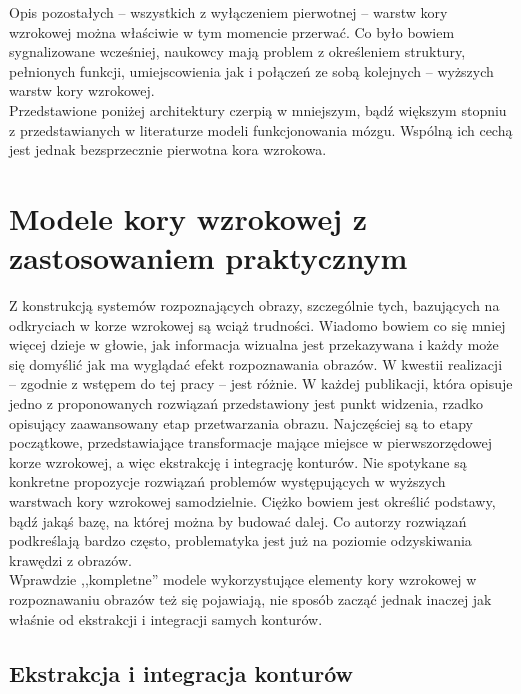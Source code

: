 Opis pozostałych -- wszystkich z wyłączeniem pierwotnej -- warstw kory wzrokowej można właściwie w tym momencie przerwać. Co było bowiem sygnalizowane wcześniej, naukowcy mają problem z określeniem struktury, pełnionych funkcji, umiejscowienia jak i połączeń ze sobą kolejnych -- wyższych warstw kory wzrokowej.\\

Przedstawione poniżej architektury czerpią w mniejszym, bądź większym stopniu z przedstawianych w literaturze modeli funkcjonowania mózgu. Wspólną ich cechą jest jednak bezsprzecznie pierwotna kora wzrokowa. 


\chapter{Modele kory wzrokowej z zastosowaniem praktycznym}
\label{praktyczneModeleKoryWzrokowej}

Z konstrukcją systemów rozpoznających obrazy, szczególnie tych, bazujących na odkryciach w korze wzrokowej są wciąż trudności. Wiadomo bowiem co się mniej więcej dzieje w głowie, jak informacja wizualna jest przekazywana i każdy może się domyślić jak ma wyglądać efekt rozpoznawania obrazów. W kwestii realizacji -- zgodnie z wstępem do tej pracy -- jest różnie. W każdej publikacji, która opisuje jedno z proponowanych rozwiązań przedstawiony jest punkt widzenia, rzadko opisujący zaawansowany etap przetwarzania obrazu. Najczęściej są to etapy początkowe, przedstawiające transformacje mające miejsce w pierwszorzędowej korze wzrokowej, a więc ekstrakcję i integrację konturów. Nie spotykane są konkretne propozycje rozwiązań problemów występujących w wyższych warstwach kory wzrokowej samodzielnie. Ciężko bowiem jest określić podstawy, bądź jakąś bazę, na której można by budować dalej. Co autorzy rozwiązań podkreślają bardzo często, problematyka jest już na poziomie odzyskiwania krawędzi z obrazów.\\

Wprawdzie ,,kompletne'' modele wykorzystujące elementy kory wzrokowej w rozpoznawaniu obrazów też się pojawiają, nie sposób zacząć jednak inaczej jak właśnie od ekstrakcji i integracji samych konturów.

\section{Ekstrakcja i integracja konturów}
\label{contourIntegration}



